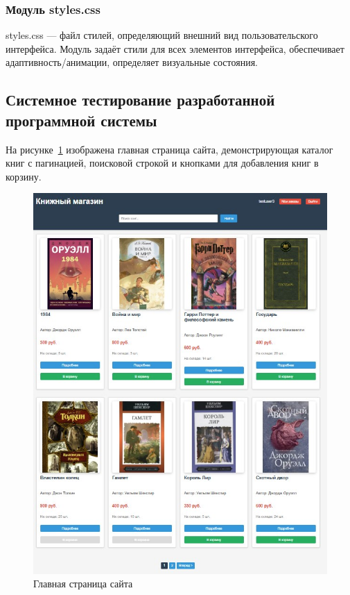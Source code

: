 \subsubsection{Модуль styles.css}
styles.css — файл стилей, определяющий внешний вид пользовательского интерфейса. Модуль задаёт стили для всех элементов интерфейса, обеспечивает адаптивность/анимации, определяет визуальные состояния.

\subsection{Системное тестирование разработанной программной системы}

На рисунке~\ref{fig:1} изображена главная страница сайта, демонстрирующая каталог книг с пагинацией, поисковой строкой и кнопками для добавления книг в корзину.
\begin{figure}[H]
	\centering
	\includegraphics[width=0.9\linewidth]{images/Главная_страница_1}
	\caption{Главная страница сайта}
	\label{fig:1}
\end{figure}

